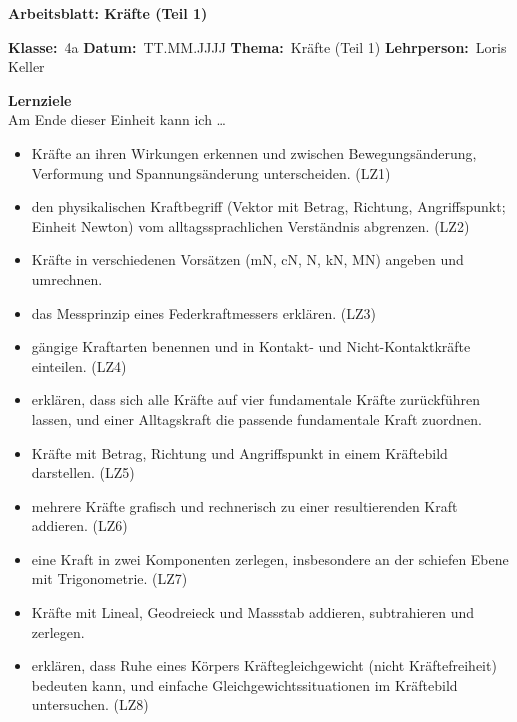 \documentclass[addpoints,11pt,a4paper]{exam}
\newcommand{\Kopfzeile}[4]{%
  \begin{titlebox}
    {\color{white}\sffamily\bfseries\Large #4}
  \end{titlebox}
  \vspace{0.5em}
  \noindent\textbf{Klasse:}~#1 \hfill \textbf{Datum:}~#2 \hfill \textbf{Thema:}~#3
    \hfill \textbf{Lehrperson:}~Loris Keller
  \vspace{0.8em}
  \lhead{\textcolor{darkgray}{#3}}
  \rhead{\textcolor{darkgray}{#4}}
}
\newcommand{\Klasse}{4a}
\newcommand{\Datum}{TT.MM.JJJJ}
\newcommand{\Thema}{Kräfte (Teil 1)}
\newcommand{\ArbeitsblattTitel}{Arbeitsblatt: Kräfte (Teil 1)}
\begin{document}
\Kopfzeile{\Klasse}{\Datum}{\Thema}{\ArbeitsblattTitel}

\begin{infobox}
\textbf{Lernziele}\\
Am Ende dieser Einheit kann ich \dots
\begin{itemize}[leftmargin=1.2cm,itemsep=0.25em]
  \item Kräfte an ihren Wirkungen erkennen und zwischen Bewegungsänderung, Verformung und Spannungsänderung unterscheiden. (LZ1)
  \item den physikalischen Kraftbegriff (Vektor mit Betrag, Richtung, Angriffspunkt; Einheit Newton) vom alltagssprachlichen Verständnis abgrenzen. (LZ2)
  \item Kräfte in verschiedenen Vorsätzen (mN, cN, N, kN, MN) angeben und umrechnen.
  \item das Messprinzip eines Federkraftmessers erklären. (LZ3)
  \item gängige Kraftarten benennen und in Kontakt- und Nicht-Kontaktkräfte einteilen. (LZ4)
  \item erklären, dass sich alle Kräfte auf vier fundamentale Kräfte zurückführen lassen, und einer Alltagskraft die passende fundamentale Kraft zuordnen.
  \item Kräfte mit Betrag, Richtung und Angriffspunkt in einem Kräftebild darstellen. (LZ5)
  \item mehrere Kräfte grafisch und rechnerisch zu einer resultierenden Kraft addieren. (LZ6)
  \item eine Kraft in zwei Komponenten zerlegen, insbesondere an der schiefen Ebene mit Trigonometrie. (LZ7)
  \item Kräfte mit Lineal, Geodreieck und Massstab addieren, subtrahieren und zerlegen.
  \item erklären, dass Ruhe eines Körpers Kräftegleichgewicht (nicht Kräftefreiheit) bedeuten kann, und einfache Gleichgewichtssituationen im Kräftebild untersuchen. (LZ8)
\end{itemize}
\end{infobox}
\end{document}

